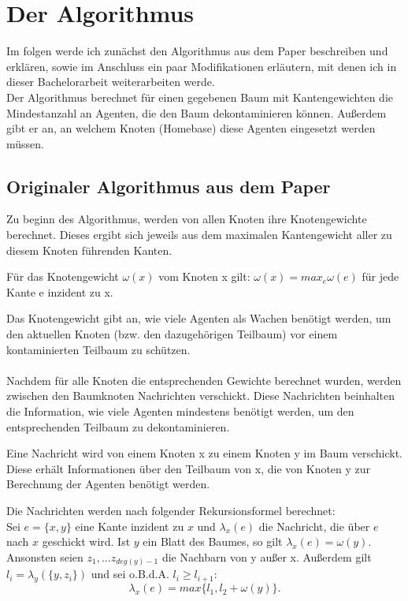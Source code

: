 \section{Der Algorithmus}\label{kap_algorithmus}
Im folgen werde ich zunächst den Algorithmus aus dem Paper \cite{cima_paper} beschreiben und erklären, sowie im Anschluss ein paar Modifikationen erläutern, mit denen ich in dieser Bachelorarbeit weiterarbeiten werde.\\
Der Algorithmus berechnet für einen gegebenen Baum mit Kantengewichten die Mindestanzahl an Agenten, die den Baum dekontaminieren können. Außerdem gibt er an, an welchem Knoten (Homebase) diese Agenten eingesetzt werden müssen.



\subsection{Originaler Algorithmus aus dem Paper}\label{paperAlgoChapter}

Zu beginn des Algorithmus, werden von allen Knoten ihre Knotengewichte berechnet. Dieses ergibt sich jeweils aus dem maximalen Kantengewicht aller zu diesem Knoten führenden Kanten. 

\begin{mydef}
	Für das Knotengewicht $\omega(x)$ vom Knoten x gilt: $\omega(x) = max_{e} \omega(e)$ für jede Kante e inzident zu x.
\end{mydef}

Das Knotengewicht gibt an, wie viele Agenten als Wachen benötigt werden, um den aktuellen Knoten (bzw. den dazugehörigen Teilbaum) vor einem kontaminierten Teilbaum zu schützen.
\\
\\
Nachdem für alle Knoten die entsprechenden Gewichte berechnet wurden, werden zwischen den Baumknoten Nachrichten verschickt. Diese Nachrichten beinhalten die Information, wie viele Agenten mindestens benötigt werden, um den entsprechenden Teilbaum zu dekontaminieren.  

\begin{mydef}\label{def_nachricht}
	Eine Nachricht wird von einem Knoten x zu einem Knoten y im Baum verschickt. Diese erhält Informationen über den Teilbaum von x, die von Knoten y zur Berechnung der Agenten benötigt werden.
\end{mydef}

Die Nachrichten werden nach folgender Rekursionsformel \cite{cima_paper} berechnet:\\
Sei $e = \{x, y\}$ eine Kante inzident zu $x$ und $\lambda_{x}(e)$ die Nachricht, die über $e$ nach $x$ geschickt wird. Ist $y$ ein Blatt des Baumes, so gilt $\lambda_{x}(e) = \omega(y)$. Ansonsten seien $z_{1}, ... z_{deg(y)-1}$ die Nachbarn von y außer x. Außerdem gilt $l_{i} = \lambda_{y}(\{y, z_{i}\})$ und sei o.B.d.A. $l_{i} \geq l_{i+1}$: $$\lambda_{x}(e) = max \{l_{1}, l_{2} + \omega(y)\}.$$



